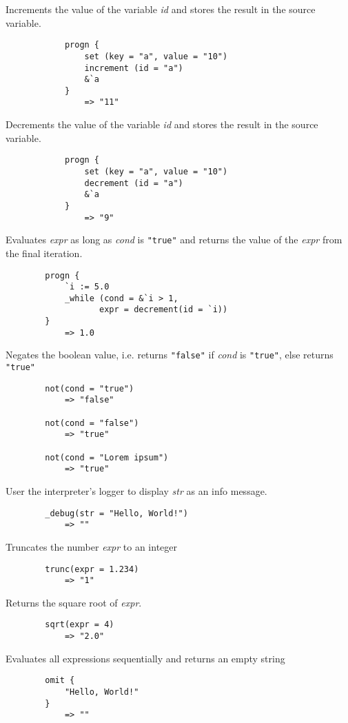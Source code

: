 \begin{multicols*}{2}
	Increments the value of the variable \textit{id} and stores the result in the source variable.
	\begin{verbatim}
			progn {
			    set (key = "a", value = "10")
			    increment (id = "a")
			    &`a
			}
			    => "11"
	\end{verbatim}
	Decrements the value of the variable \textit{id} and stores the result in the source variable.
	\begin{verbatim}
			progn {
			    set (key = "a", value = "10")
			    decrement (id = "a")
			    &`a
			}
			    => "9"
	\end{verbatim}
	Evaluates \textit{expr} as long as \textit{cond} is \verb|"true"| and returns the value of the \textit{expr}
	from the final iteration.
	\begin{verbatim}
		progn {
		    `i := 5.0
		    _while (cond = &`i > 1,
		           expr = decrement(id = `i))
		}
		    => 1.0
	\end{verbatim}
	Negates the boolean value, i.e. returns \verb|"false"| if \textit{cond} is \verb|"true"|, else returns \verb|"true"|
	\begin{verbatim}
		not(cond = "true")
		    => "false"

		not(cond = "false")
		    => "true"

		not(cond = "Lorem ipsum")
		    => "true"
	\end{verbatim}
	User the interpreter's logger to display \textit{str} as an info message.
	\begin{verbatim}
		_debug(str = "Hello, World!")
		    => ""
	\end{verbatim}
	Truncates the number \textit{expr} to an integer
	\begin{verbatim}
		trunc(expr = 1.234)
		    => "1"
	\end{verbatim}
	Returns the square root of \textit{expr}.
	\begin{verbatim}
		sqrt(expr = 4)
		    => "2.0"
	\end{verbatim}
	Evaluates all expressions sequentially and returns an empty string
	\begin{verbatim}
		omit {
		    "Hello, World!"
		}
		    => ""
	\end{verbatim}
\end{multicols*}
\newpage
